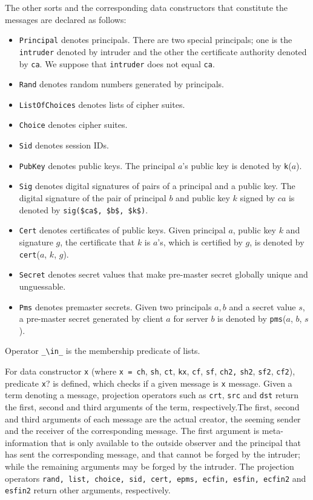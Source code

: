 \documentclass[a4paper,fleqn]{cas-dc}
\begin{document}
The other sorts and the corresponding data
constructors that constitute the messages are declared as follows:
\begin{itemize}
  \item \verb!Principal! denotes principals. There are two special principals; one is the \verb!intruder! denoted by intruder and the other the certificate authority denoted by \verb!ca!. We suppose that \verb!intruder! does not equal \verb!ca!. 
  \item \verb!Rand! denotes random numbers generated by principals.
\item \verb!ListOfChoices! denotes lists of cipher suites.
  \item \verb!Choice! denotes cipher suites. 
  \item \verb!Sid! denotes session IDs. 
  \item \verb!PubKey! denotes public keys. The principal $a$’s public key is denoted by \verb!k!($a$).
\item \verb!Sig! denotes digital signatures of pairs of a principal and a public key. The digital signature of the pair of principal $b$ and public key $k$ signed by $ca$ is denoted by \verb!sig($ca$, $b$, $k$)!.
\item \verb!Cert! denotes certificates of public keys. Given principal $a$, public key $k$ and signature $g$, the certificate that $k$ is $a$’s,
which is certified by $g$, is denoted by \verb!cert!($a$, $k$, $g$).
\item \verb!Secret! denotes secret values that make pre-master secret globally unique and unguessable. 
\item \verb!Pms! denotes premaster secrets. Given two principals $a,b$ and a secret value $s$, a pre-master secret generated by client $a$ for server $b$ is denoted by \verb!pms!($a$, $b$, $s$).
\end{itemize}

Operator \verb|_\in_| is the membership predicate of lists.

For data constructor \verb!x! (where \verb!x = ch!, \verb!sh!, \verb!ct!, \verb!kx!, \verb!cf!, \verb!sf!, \verb!ch2,! \verb!sh2!, \verb!sf2!, \verb!cf2!), predicate \verb!x!? is defined, which checks if a given message is \verb!x! message. Given a term denoting a message, projection operators such as \verb!crt!, \verb!src! and \verb!dst! return the first, second and third arguments of the term, respectively.The first, second and  third  arguments  of  each  message are  the  actual creator,  the  seeming  sender  and  the  receiver  of the  corresponding message. The first argument is meta-information that is only available to the outside observer and the principal that has sent the corresponding message, and that cannot be forged by the intruder; while the remaining arguments may be forged by the intruder. The projection operators \verb!rand, list, choice, sid, cert, epms, ecfin, esfin, ecfin2! and \verb!esfin2! return other arguments, respectively.
\end{document}
